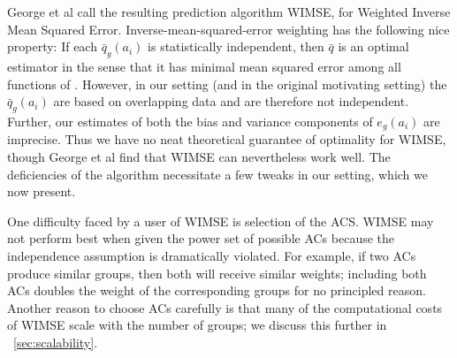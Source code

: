 George et al call the resulting prediction algorithm WIMSE, for Weighted Inverse Mean Squared Error.  Inverse-mean-squared-error weighting has the following nice property: If each $\bar{q}_{g}(a_i)$ is statistically independent, then $\bar{q}$ is an optimal estimator in the sense that it has minimal mean squared error among all functions of \cite{}.  However, in our setting (and in the original motivating setting) the $\bar{q}_{g}(a_i)$ are based on overlapping data and are therefore not independent.  Further, our estimates of both the bias and variance components of $e_{g}(a_i)$ are imprecise.  Thus we have no neat theoretical guarantee of optimality for WIMSE, though George et al find that WIMSE can nevertheless work well.  The deficiencies of the algorithm necessitate a few tweaks in our setting, which we now present.

\begin{figure}[t!]
\centering
{}
\label{fig:acs-comparison}
\end{figure}

One difficulty faced by a user of WIMSE is selection of the ACS.  WIMSE may not perform best when given the power set of possible ACs because the independence assumption is dramatically violated.  For example, if two ACs produce similar groups, then both will receive similar weights; including both ACs doubles the weight of the corresponding groups for no principled reason.  Another reason to choose ACs carefully is that many of the computational costs of WIMSE scale with the number of groups; we discuss this further in \Section~\ref{sec:scalability}.

